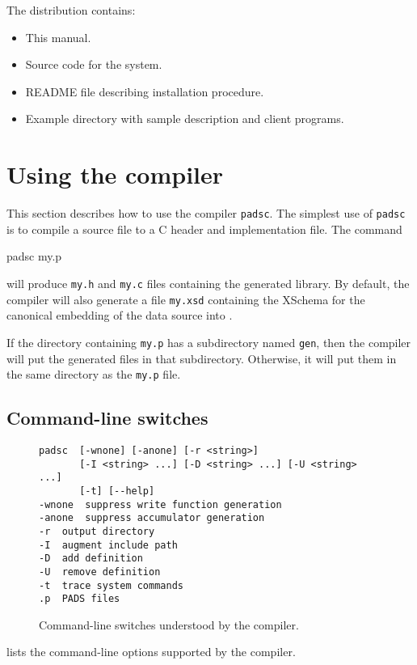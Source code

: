 \begin{center}
\end{center}

\noindent
The \PADS{} distribution contains:
\begin{itemize}
\item This manual.
\item Source code for the \pads{} system.
\item README file describing installation procedure.
\item Example directory with sample \PADS{} description and client programs.
\end{itemize}

\section{Using the \PADS{} compiler}
This section describes how to use the \PADS{} compiler \texttt{padsc}.
The simplest use of \texttt{padsc} is to compile a \PADSL{} source file
to a C header and implementation file.  The command
\begin{centercode}
padsc my.p
\end{centercode} %
will produce \texttt{my.h} and \texttt{my.c} files containing the
generated library.  By default, the compiler will also generate a file
\texttt{my.xsd} containing the XSchema for the \PADS{} canonical
embedding of the data source into \xml{}.

If the directory containing \texttt{my.p} has a subdirectory named
\texttt{gen}, then the compiler will put the generated files in that
subdirectory.  Otherwise, it will put them in the same directory as
the \texttt{my.p} file.

\subsection{Command-line switches}
\begin{figure}
\begin{verbatim}
padsc  [-wnone] [-anone] [-r <string>] 
       [-I <string> ...] [-D <string> ...] [-U <string> ...] 
       [-t] [--help]
-wnone	suppress write function generation
-anone	suppress accumulator generation
-r	output directory
-I	augment include path
-D	add definition
-U	remove definition
-t	trace system commands
.p	PADS files
\end{verbatim}
\caption{Command-line switches understood by the \pads{} compiler.}
\label{figure:intro-switches}
\end{figure}
 lists the command-line options
supported by the \pads{} compiler.



